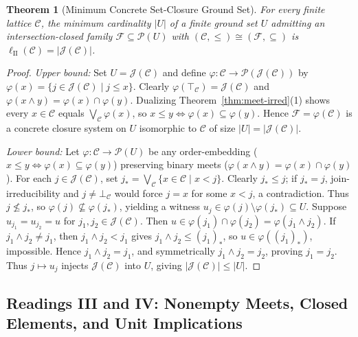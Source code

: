 \documentclass[11pt,a4paper]{article}
\newtheorem{theorem}{Theorem}[section]
\theoremstyle{definition}
\theoremstyle{remark}
\begin{document}
\begin{theorem}[Minimum Concrete Set-Closure Ground Set]\label{thm:ground-set}
For every finite lattice $\mathcal{C}$, the minimum cardinality $|U|$ of a finite ground set $U$ admitting an intersection-closed family $\mathcal{F} \subseteq \mathcal{P}(U)$ with $(\mathcal{C}, \le) \cong (\mathcal{F}, \subseteq)$ is $\ell_{\mathrm{II}}(\mathcal{C}) = |\mathcal{J}(\mathcal{C})|$.
\end{theorem}

\begin{proof}
\emph{Upper bound:} Set $U = \mathcal{J}(\mathcal{C})$ and define $\varphi : \mathcal{C} \to \mathcal{P}(\mathcal{J}(\mathcal{C}))$ by $\varphi(x) = \{ j \in \mathcal{J}(\mathcal{C}) \mid j \le x \}$. Clearly $\varphi(\top_{\mathcal{C}}) = \mathcal{J}(\mathcal{C})$ and $\varphi(x \wedge y) = \varphi(x) \cap \varphi(y)$. Dualizing Theorem~\ref{thm:meet-irred}(1) shows every $x \in \mathcal{C}$ equals $\bigvee_{\mathcal{C}} \varphi(x)$, so $x \le y \iff \varphi(x) \subseteq \varphi(y)$. Hence $\mathcal{F} = \varphi(\mathcal{C})$ is a concrete closure system on $U$ isomorphic to $\mathcal{C}$ of size $|U| = |\mathcal{J}(\mathcal{C})|$.

\emph{Lower bound:} Let $\varphi : \mathcal{C} \to \mathcal{P}(U)$ be any order-embedding ($x \le y \iff \varphi(x) \subseteq \varphi(y)$) preserving binary meets ($\varphi(x \wedge y) = \varphi(x) \cap \varphi(y)$). For each $j \in \mathcal{J}(\mathcal{C})$, set $j_* = \bigvee_{\mathcal{C}} \{ x \in \mathcal{C} \mid x < j \}$. Clearly $j_* \le j$; if $j_* = j$, join-irreducibility and $j \neq \bot_{\mathcal{C}}$ would force $j = x$ for some $x < j$, a contradiction. Thus $j \not\le j_*$, so $\varphi(j) \not\subseteq \varphi(j_*)$, yielding a witness $u_j \in \varphi(j) \setminus \varphi(j_*) \subseteq U$. Suppose $u_{j_1} = u_{j_2} = u$ for $j_1, j_2 \in \mathcal{J}(\mathcal{C})$. Then $u \in \varphi(j_1) \cap \varphi(j_2) = \varphi(j_1 \wedge j_2)$. If $j_1 \wedge j_2 \neq j_1$, then $j_1 \wedge j_2 < j_1$ gives $j_1 \wedge j_2 \le (j_1)_*$, so $u \in \varphi((j_1)_*)$, impossible. Hence $j_1 \wedge j_2 = j_1$, and symmetrically $j_1 \wedge j_2 = j_2$, proving $j_1 = j_2$. Thus $j \mapsto u_j$ injects $\mathcal{J}(\mathcal{C})$ into $U$, giving $|\mathcal{J}(\mathcal{C})| \le |U|$.
\end{proof}

\subsection{Readings III and IV: Nonempty Meets, Closed Elements, and Unit Implications}
\end{document}
